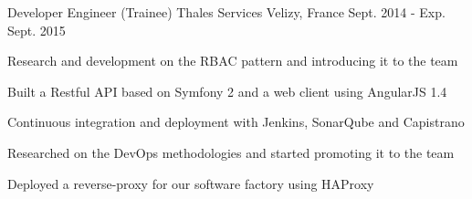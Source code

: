 \begin{cventries}
  \cventry
    {Developer Engineer (Trainee)} %
    {Thales Services} %
    {Velizy, France} %
    {Sept. 2014 - Exp. Sept. 2015} %
    {
      \begin{cvitems} %
          \item {Research and development on the RBAC pattern and introducing it to the team}
          \item {Built a Restful API based on Symfony 2 and a web client using AngularJS 1.4}
          \item {Continuous integration and deployment with Jenkins, SonarQube and Capistrano}
          \item {Researched on the DevOps methodologies and started promoting it to the team}
          \item {Deployed a reverse-proxy for our software factory using HAProxy}
      \end{cvitems}
    }

\end{cventries}

